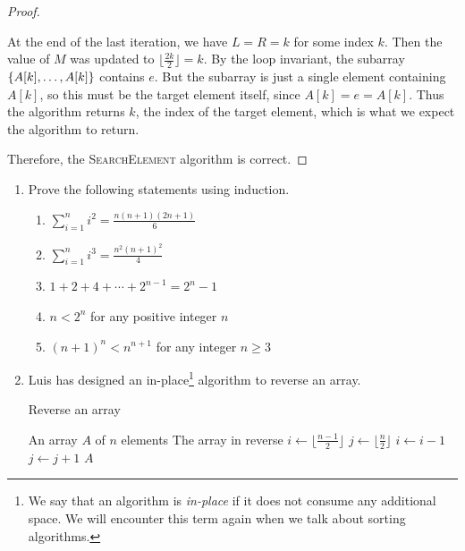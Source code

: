 \begin{example}
\begin{proof}
\begin{enumerate}
                At the end of the last iteration, we have $L = R = k$ for some index $k$. Then the value of $M$ was updated to $\lfloor\frac{2k}{2}\rfloor = k$. By the loop invariant, the subarray $\left\{A[k],\ldots,A[k]\right\}$ contains $e$. But the subarray is just a single element containing $A[k]$, so this must be the target element itself, since $A[k] = e = A[k]$. Thus the algorithm returns $k$, the index of the target element, which is what we expect the algorithm to return.
        \end{enumerate}

        Therefore, the \textsc{SearchElement} algorithm is correct.
    \end{proof}
\end{example}



\begin{exercises}
    \begin{enumerate}
        \item Prove the following statements using induction.
            \begin{enumerate}
                \item $\displaystyle\sum_{i=1}^n i^2 = \frac{n\left(n+1\right)\left(2n+1\right)}{6}$
                \item $\displaystyle\sum_{i=1}^n i^3 = \frac{n^2 \left(n+1\right)^2}{4}$
                \item $1 + 2 + 4 + \cdots + 2^{n-1} = 2^n - 1$
                \item $n < 2^n$ for any positive integer $n$
                \item $\left(n+1\right)^n < n^{n+1}$ for any integer $n \ge 3$
            \end{enumerate}


        \item Luis has designed an in-place\footnote{We say that an algorithm is \textit{in-place} if it does not consume any additional space. We will encounter this term again when we talk about sorting algorithms.} algorithm to reverse an array.
            \begin{algorithm}[H]
                \caption{Reverse an array}
                \begin{algorithmic}[1]
                    \Require An array $A$ of $n$ elements
                    \Ensure The array in reverse
                        \State $i \gets \lfloor\frac{n-1}{2}\rfloor$
                        \State $j \gets \lfloor\frac{n}{2}\rfloor$
                            \State {}
                            \State $i \gets i-1$
                            \State $j \gets j+1$
                        \EndWhile
                        \Return $A$
                    \EndFunction
                \end{algorithmic}
           \end{algorithm}


\end{enumerate}
\end{exercises}
